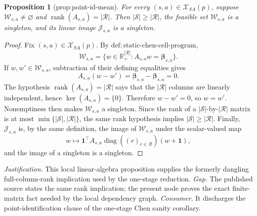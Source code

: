 \documentclass{article}
\newtheorem{proposition}{Proposition}
\begin{document}
\begin{proposition}[prop:point-id-mean]\label{prop:point-id-mean}
For every \((s,a)\in\mathcal X_{SA}(p)\), suppose \(\mathcal W_{s,a}\ne\varnothing\) and \(\operatorname{rank}(A_{s,a})=|\mathcal R|\). Then \(|\mathcal S|\ge |\mathcal R|\), the feasible set \(\mathcal W_{s,a}\) is a singleton, and its linear image \(\mathcal J_{s,a}\) is a singleton.
\end{proposition}
\begin{proof}
Fix \((s,a)\in\mathcal X_{SA}(p)\). By \(\mathrm{def{:}static\text{-}chen\text{-}cell\text{-}program}\),
\[
\mathcal W_{s,a}=\{w\in\mathbb R_+^{|\mathcal R|}:A_{s,a}w=\boldsymbol\beta_{s,a}\}.
\]
If \(w,w'\in\mathcal W_{s,a}\), subtraction of their defining equalities gives
\[
A_{s,a}(w-w')=\boldsymbol\beta_{s,a}-\boldsymbol\beta_{s,a}=0.
\]
The hypothesis \(\operatorname{rank}(A_{s,a})=|\mathcal R|\) says that the \(|\mathcal R|\) columns are linearly independent, hence \(\ker(A_{s,a})=\{0\}\). Therefore \(w-w'=0\), so \(w=w'\). Nonemptiness then makes \(\mathcal W_{s,a}\) a singleton. Since the rank of a \(|\mathcal S|\)-by-\(|\mathcal R|\) matrix is at most \(\min\{|\mathcal S|,|\mathcal R|\}\), the same rank hypothesis implies \(|\mathcal S|\ge |\mathcal R|\). Finally, \(\mathcal J_{s,a}\) is, by the same definition, the image of \(\mathcal W_{s,a}\) under the scalar-valued map
\[
w\longmapsto \mathbf 1^\top A_{s,a}\operatorname{diag}((r)_{r\in\mathcal R})(w+\mathbf 1),
\]
and the image of a singleton is a singleton.
\end{proof}
\par\smallskip\noindent \textit{Justification.} This local linear-algebra proposition supplies the formerly dangling full-column-rank implication used by the one-stage reduction. \textit{Gap.} The published source states the same rank implication; the present node proves the exact finite-matrix fact needed by the local dependency graph. \textit{Consumer.} It discharges the point-identification clause of the one-stage Chen sanity corollary.
\end{document}
